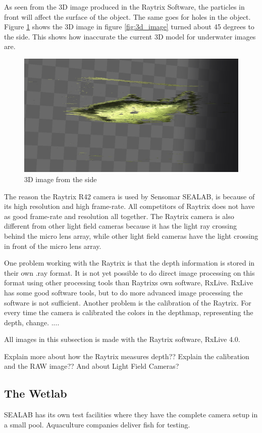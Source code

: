 As seen from the 3D image produced in the Raytrix Software, the particles in front will affect the surface of the object. The same goes for holes in the object. Figure \ref{fig:3d_image_side} shows the 3D image in figure \ref{fig:3d_image} turned about 45 degrees to the side. This shows how inaccurate the current 3D model for underwater images are. 

\begin{figure}[h]
    \centering
    \includegraphics[width=.9\linewidth]{images/introduction/depth3D_side}
    \caption{3D image from the side}
    \label{fig:3d_image_side}
\end{figure}

The reason the Raytrix R42 camera is used by Sensomar SEALAB, is because of its high resolution and high frame-rate. All competitors of Raytrix does not have as good frame-rate and resolution all together. The Raytrix camera is also different from other light field cameras because it has the light ray crossing behind the micro lens array, while other light field cameras have the light crossing in front of the micro lens array.

One problem working with the Raytrix is that the depth information is stored in their own .ray format. It is not yet possible to do direct image processing on this format using other processing tools than Raytrixs own software, RxLive. RxLive has some good software tools, but to do more advanced image processing the software is not sufficient.
Another problem is the calibration of the Raytrix. For every time the camera is calibrated the colors in the depthmap, representing the depth, change. ....

All images in this subsection is made with the Raytrix software, RxLive 4.0.



{\color{red}Explain more about how the Raytrix measures depth?? Explain the calibration and the RAW image?? And about Light Field Cameras?}





\subsection{The Wetlab}\label{wetlab}

SEALAB has its own test facilities where they have the complete camera setup in a small pool. Aquaculture companies deliver fish for testing.